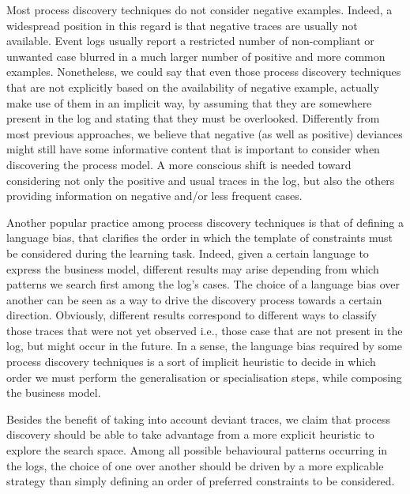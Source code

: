 Most process discovery techniques do not consider negative examples. Indeed, a widespread position in this regard is that negative traces are usually not available. Event logs usually report a restricted number of non-compliant or unwanted case blurred in a much larger number of positive and more common examples. Nonetheless, we could say that even those process discovery techniques that are not explicitly based on the availability of negative example, actually make use of them in an implicit way, by assuming that they are somewhere present in the log and stating that they must be overlooked.
Differently from most previous approaches, we believe that negative (as well as positive) deviances might still have some informative content that is important to consider when discovering the process model. A more conscious shift is needed toward considering not only the positive and usual traces in the log, but also the others providing information on negative and/or less frequent cases.

Another popular practice among process discovery techniques is that of defining a language bias, that clarifies the order in which the template of constraints must be considered during the learning task. Indeed, given a certain language to express the business model, different results may arise depending from which patterns we search first among the log's cases. The choice of a language bias over another can be seen as a way to drive the discovery process towards a certain direction. Obviously, different results correspond to different ways to classify those traces that were not yet observed i.e., those case that are not present in the log, but might occur in the future.
In a sense, the language bias required by some process discovery techniques is a sort of implicit heuristic to decide in which order we must perform the generalisation or specialisation steps, while composing the business model.

Besides the benefit of taking into account deviant traces, we claim that process discovery should be able to take advantage from a more explicit heuristic to explore the search space. Among all possible behavioural patterns occurring in the logs, the choice of one over another should be driven by a more explicable strategy than simply defining an order of preferred constraints to be considered.
 
